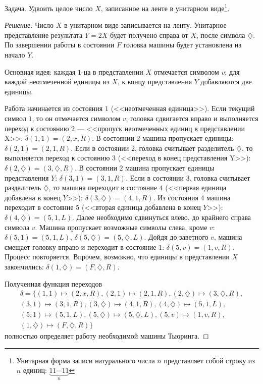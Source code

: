 \begin{exampl}
    Задача. Удвоить целое число $X$, записанное на ленте в унитарном виде\footnote{Унитарная форма записи натурального числа $n$ представляет собой строку из $n$ единиц: $\underbrace{11\cdots 11}_n$}.
\end{exampl}
\begin{proof}[Решение]
    Число $X$ в унитарном виде записывается на ленту. Унитарное представление результата $Y=2X$ будет получено справа от $X$, после символа $\diamondsuit$. По завершении работы в состоянии $F$ головка машины будет установлена на начало $Y$.
    
    Основная идея: каждая $1$-ца в представлении $X$ отмечается символом $v$; для каждой неотмеченной единицы из $X$, к концу представления $Y$ добавляются две единицы.
    
    Работа начинается из состояния $1$ (<<неотмеченная единица>>). Если текущий символ $1$, то он отмечается символом $v$, головка сдвигается вправо и выполняется переход к состоянию $2$ --- <<пропуск неотмеченных единиц в представлении X>>: $\delta(1,1)=(2,x,R)$. В состоянии $2$ машина пропускает единицы: $\delta(2,1)=(2,1,R)$. Если в состоянии $2$, головка считывает разделитель $\diamondsuit$, то выполняется переход к состоянию $3$ (<<переход в конец представления Y>>): $\delta(2,\diamondsuit)=(3,\diamondsuit,R)$. В состоянии $2$ машина пропускает единицы представления $Y$: $\delta(3,1)=(3,1,R)$. Если в состоянии $3$, головка считывает разделитель $\diamondsuit$, то машина переходит в состояние $4$ (<<первая единица добавлена в конец $Y$>>): $\delta(3,\diamondsuit)=(4,1,R)$. Из состояния $4$ машина переходит в состояние $5$ (<<вторая единица добавлена в конец $Y$>>):$\delta(4,\diamondsuit)=(5,1,L)$. Далее необходимо сдвинуться влево, до крайнего справа символа $v$. Машина пропускает возможные символы слева, кроме $v$: $\delta(5,1)=(5,1,L)$, $\delta(5,\diamondsuit)=(5,\diamondsuit,L)$. Дойдя до заветного $v$, машина смещает головку вправо и переходит в состояние $1$: $\delta(5,v)=(1,v,R)$. Процесс повторяется. Впрочем, возможно, что единицы в представлении $X$ закончились: $\delta(1,\diamondsuit)=(F,\diamondsuit,R)$.
    
    Полученная функция переходов
    \[
        \begin{split}
            \delta=\{
                (1,1)           \mapsto(2,x,R),
                (2,1)           \mapsto(2,1,R),
                (2,\diamondsuit)\mapsto(3,\diamondsuit,R),\\
                (3,1)           \mapsto(3,1,R),
                (3,\diamondsuit)\mapsto(4,1,R),
                (4,\diamondsuit)\mapsto(5,1,L),\\
                (5,1)           \mapsto(5,1,L),
                (5,\diamondsuit)\mapsto(5,\diamondsuit,L),
                (5,v)           \mapsto(1,v,R),\\
                (1,\diamondsuit)\mapsto(F,\diamondsuit,R)
            \}
        \end{split}
    \]
    полностью определяет работу необходимой машины Тьюринга.
\end{proof}


